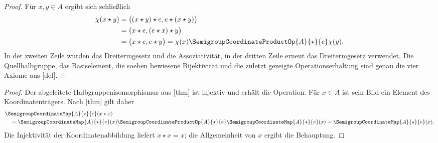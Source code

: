 \documentclass[main.tex]{subfiles}
\begin{document}
\begin{proof}
F\"ur \(x,y\in A\) ergibt sich schlie\ss lich
\[
\begin{aligned}
 \chi(x\star y)
 &=\bigl((x\star y)\star e,e\star(x\star y)\bigr)\\
 &=\bigl(x\star e,(e\star x)\star y\bigr)\\
 &=\bigl(x\star e,e\star y\bigr)
  =\chi(x)\SemigroupCoordinateProductOp{A}{\star}{e}\chi(y).
\end{aligned}
\]
In der zweiten Zeile wurden das Dreitermgesetz und die Assoziativit\"at,
in der dritten Zeile erneut das Dreitermgesetz verwendet.  Die
Quellhalbgruppe, das Basiselement, die soeben bewiesene Bijektivit\"at und
die zuletzt gezeigte Operationserhaltung sind genau die vier Axiome aus
[def].
\end{proof}

\begin{proof}
Der abgeleitete Halbgruppenisomorphismus aus
[thm] ist injektiv
und erh\"alt die Operation.  F\"ur \(x\in A\) ist sein Bild ein Element
des Koordinatentr\"agers.  Nach
[thm] gilt daher
\[
 \begin{aligned}
 &\SemigroupCoordinateMap{A}{\star}{e}(x\star x)\\
 &\quad=
 \SemigroupCoordinateMap{A}{\star}{e}(x)
 \SemigroupCoordinateProductOp{A}{\star}{e}
 \SemigroupCoordinateMap{A}{\star}{e}(x)
 =\SemigroupCoordinateMap{A}{\star}{e}(x).
 \end{aligned}
\]
Die Injektivit\"at der Koordinatenabbildung liefert \(x\star x=x\);
die Allgemeinheit
von \(x\) ergibt die Behauptung.
\end{proof}
\end{document}
